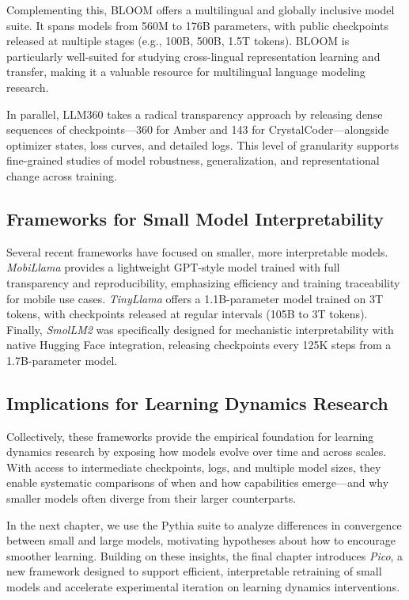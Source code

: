 Complementing this, BLOOM \citep{le2023bloom} offers a multilingual and globally inclusive model suite. It spans models from 560M to 176B parameters, with public checkpoints released at multiple stages (e.g., 100B, 500B, 1.5T tokens). BLOOM is particularly well-suited for studying cross-lingual representation learning and transfer, making it a valuable resource for multilingual language modeling research.

In parallel, LLM360 \citep{liu2023llm360} takes a radical transparency approach by releasing dense sequences of checkpoints—360 for Amber and 143 for CrystalCoder—alongside optimizer states, loss curves, and detailed logs. This level of granularity supports fine-grained studies of model robustness, generalization, and representational change across training.

\subsection{Frameworks for Small Model Interpretability}

Several recent frameworks have focused on smaller, more interpretable models. \textit{MobiLlama} \citep{thawakar2024mobillama} provides a lightweight GPT-style model trained with full transparency and reproducibility, emphasizing efficiency and training traceability for mobile use cases. \textit{TinyLlama} \citep{liu2023llm360} offers a 1.1B-parameter model trained on 3T tokens, with checkpoints released at regular intervals (105B to 3T tokens). Finally, \textit{SmolLM2} was specifically designed for mechanistic interpretability with native Hugging Face integration, releasing checkpoints every 125K steps from a 1.7B-parameter model. 

\subsection{Implications for Learning Dynamics Research}

Collectively, these frameworks provide the empirical foundation for learning dynamics research by exposing how models evolve over time and across scales. With access to intermediate checkpoints, logs, and multiple model sizes, they enable systematic comparisons of when and how capabilities emerge—and why smaller models often diverge from their larger counterparts.

In the next chapter, we use the Pythia suite to analyze differences in convergence between small and large models, motivating hypotheses about how to encourage smoother learning. Building on these insights, the final chapter introduces \textit{Pico}, a new framework designed to support efficient, interpretable retraining of small models and accelerate experimental iteration on learning dynamics interventions.
